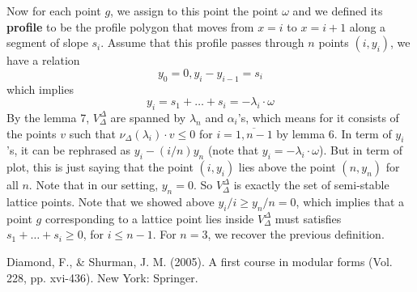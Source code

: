 \documentclass[12pt]{article} %
\begin{document}
    Now for each point $g$, we assign to this point the point $\omega$ and we defined its \textbf{profile} to be  the profile polygon that moves from $x=i$ to $x=i+1$ along a segment
    of slope $s_i$. Assume that this profile passes through $n$ points $(i,y_i)$, we have a relation
    \[y_0 = 0, y_{i}-y_{i-1} = s_{i}\]
    which implies
    \[y_i = s_1+\ldots+s_i = -\lambda_i \cdot \omega\]
    By the lemma 7, $V_\Delta^\Delta$ are spanned by $\lambda_n$ and $\alpha_i$'s, which means for it consists of the points $v$ such that
    $\nu_\Delta(\lambda_i) \cdot v  \le 0$ for $i=\overline{1,n-1}$ by lemma 6. In term of $y_i$'s, it can be rephrased as $y_i - (i/n)y_n$ (note that $y_i = -\lambda_i\cdot \omega$).
    But in term of plot, this is just saying that the point $(i,y_i)$ lies above the point $(n,y_n)$ for all $n$. Note that in our setting, $y_n=0$. So $V_{\Delta}^\Delta$ is exactly the set of semi-stable lattice points. 
    Note that we showed above $y_i/i \ge y_n/n = 0$, which implies that a point $g$ corresponding to a lattice point lies inside $V_{\Delta}^\Delta$ must satisfies $s_1+\ldots+s_i \ge 0$, for $i\le n-1$. For $n=3$, we recover the previous definition.
\begin{thebibliography}{}

      Diamond, F., \& Shurman, J. M. (2005). A first course in modular forms (Vol. 228, pp. xvi-436). New York: Springer.
\end{thebibliography}
\end{document}
